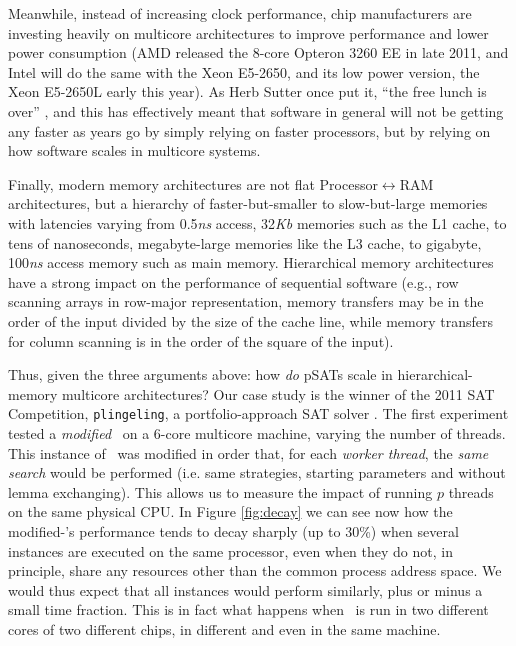 \documentclass{llncs}
\begin{document}
Meanwhile, instead of increasing clock performance, chip manufacturers
are investing heavily on multicore architectures to improve
performance and lower power consumption (AMD released the 8-core
Opteron 3260 EE in late 2011, and Intel will do the same with the Xeon
E5-2650, and its low power version, the Xeon E5-2650L early this
year). As Herb Sutter once put it, ``the free lunch is over''
\cite{FreeLunchIsOver}, and this has effectively meant that software
in general will not be getting any faster as years go by simply
relying on faster processors, but by relying on how software scales in
multicore systems.

Finally, modern memory architectures are not flat
Processor$\leftrightarrow$RAM architectures, but a hierarchy of
faster-but-smaller to slow-but-large memories with latencies varying
from 0.5{\it ns} access, 32{\it Kb} memories such as the L1 cache, to
tens of nanoseconds, megabyte-large memories like the L3 cache, to
gigabyte, 100{\it ns} access memory such as main memory. Hierarchical
memory architectures have a strong impact on the performance of
sequential software (e.g., row scanning arrays in row-major
representation, memory transfers may be in the order of the input
divided by the size of the cache line, while memory transfers for
column scanning is in the order of the square of the input). %

Thus, given the three arguments above: how {\em do} pSATs scale in
hierarchical-memory multicore architectures? Our case study is the
winner of the 2011 SAT Competition, {\tt plingeling}, a
portfolio-approach SAT solver \cite{lingeling}. The first experiment
tested a \emph{modified} \pling\ on a 6-core multicore machine,
varying the number of threads. This instance of \pling\ was modified
in order that, for each {\em worker thread}, the {\em same search}
would be performed (i.e. same strategies, starting parameters and
without lemma exchanging). This allows us to measure the impact of
running $p$ threads on the same physical CPU. In Figure
\ref{fig:decay} we can see now how the modified-\pling's performance
tends to decay sharply (up to 30\%) when several instances are
executed on the same processor, even when they do not, in principle,
share any resources other than the common process address space. We
would thus expect that all instances would perform similarly, plus or
minus a small time fraction. This is in fact what happens when \pling\
is run in two different cores of two different chips, in different
and even in the same machine.
\end{document}
